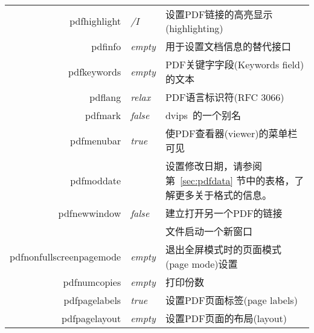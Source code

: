 \documentclass{article}
\begin{document}
\begin{longtable}{@{}>{\ttfamily}rlp{7cm}@{}}
  pdfhighlight                        & \textit{/I}            & 设置PDF链接的高亮显示(highlighting)                                                                      \\
  pdfinfo                             & \textit{empty}         & 用于设置文档信息的替代接口                                                                                   \\
  pdfkeywords                         & \textit{empty}         & PDF关键字字段(Keywords field)的文本                                                                     \\
  pdflang                             & \textit{relax}         & PDF语言标识符(RFC 3066)                                                                              \\
  pdfmark                             & \textit{false}         & \textsf{dvips}\ 的一个别名                                                                           \\
  pdfmenubar                          & \textit{true}          & 使PDF查看器(viewer)的菜单栏可见                                                                           \\
  pdfmoddate                          &                        & 设置修改日期，请参阅第~\ref{sec:pdfdata} 节中的表格，了解更多关于格式的信息。                                                \\
  pdfnewwindow                        & \textit{false}         & 建立打开另一个PDF的链接                                                                                   \\
                                      &                        & 文件启动一个新窗口                                                                                       \\
  pdfnonfullscreenpagemode
                                      & \textit{empty}         & 退出全屏模式时的页面模式(page mode)设置                                                                       \\
  pdfnumcopies                        & \textit{empty}         & 打印份数                                                                                            \\
  pdfpagelabels                       & \textit{true}          & 设置PDF页面标签(page labels)                                                                          \\
  pdfpagelayout                       & \textit{empty}         & 设置PDF页面的布局(layout)                                                                              \\

\end{longtable}
\end{document}
